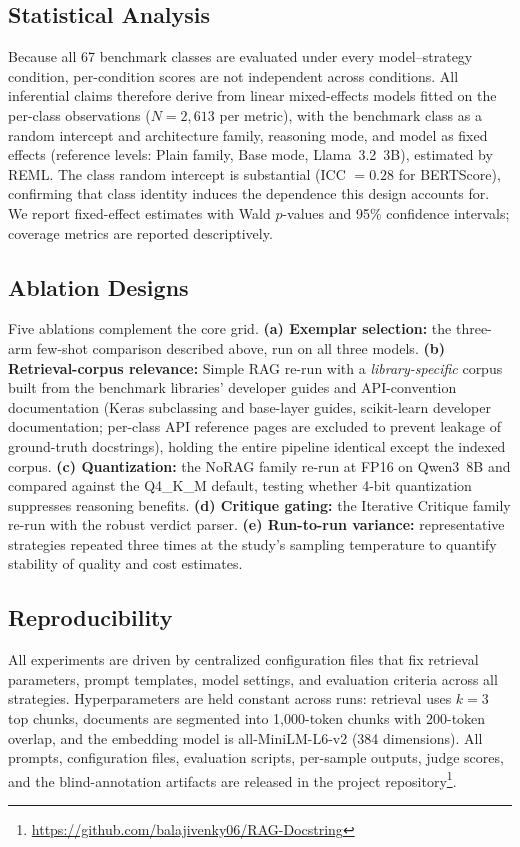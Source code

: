 \documentclass[pdflatex,sn-mathphys-ay]{sn-jnl}%
\theoremstyle{thmstyleone}%
\theoremstyle{thmstyletwo}%
\theoremstyle{thmstylethree}%
\begin{document}
\subsection{Statistical Analysis}
\label{sec:stats-design}
Because all 67 benchmark classes are evaluated under every model--strategy condition, per-condition scores are not independent across conditions. All inferential claims therefore derive from linear mixed-effects models fitted on the per-class observations ($N{=}2{,}613$ per metric), with the benchmark class as a random intercept and architecture family, reasoning mode, and model as fixed effects (reference levels: Plain family, Base mode, Llama~3.2~3B), estimated by REML. The class random intercept is substantial (ICC $=0.28$ for BERTScore), confirming that class identity induces the dependence this design accounts for. We report fixed-effect estimates with Wald $p$-values and 95\% confidence intervals; coverage metrics are reported descriptively.

\subsection{Ablation Designs}
\label{sec:ablations-design}
Five ablations complement the core grid. \textbf{(a) Exemplar selection:} the three-arm few-shot comparison described above, run on all three models. \textbf{(b) Retrieval-corpus relevance:} Simple RAG re-run with a \emph{library-specific} corpus built from the benchmark libraries' developer guides and API-convention documentation (Keras subclassing and base-layer guides, scikit-learn developer documentation; per-class API reference pages are excluded to prevent leakage of ground-truth docstrings), holding the entire pipeline identical except the indexed corpus. \textbf{(c) Quantization:} the NoRAG family re-run at FP16 on Qwen3~8B and compared against the Q4\_K\_M default, testing whether 4-bit quantization suppresses reasoning benefits. \textbf{(d) Critique gating:} the Iterative Critique family re-run with the robust verdict parser. \textbf{(e) Run-to-run variance:} representative strategies repeated three times at the study's sampling temperature to quantify stability of quality and cost estimates.

\subsection{Reproducibility}
All experiments are driven by centralized configuration files that fix retrieval parameters, prompt templates, model settings, and evaluation criteria across all strategies. Hyperparameters are held constant across runs: retrieval uses $k=3$ top chunks, documents are segmented into 1,000-token chunks with 200-token overlap, and the embedding model is all-MiniLM-L6-v2 (384 dimensions). All prompts, configuration files, evaluation scripts, per-sample outputs, judge scores, and the blind-annotation artifacts are released in the project repository\footnote{\label{git}\url{https://github.com/balajivenky06/RAG-Docstring}}.
\end{document}
